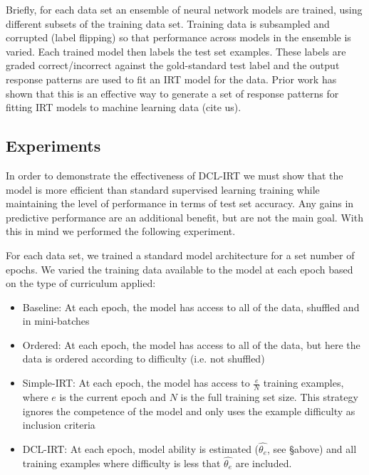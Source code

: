 \documentclass[letterpaper]{article} %
\begin{document}
Briefly, for each data set an ensemble of neural network models are trained, using different subsets of the training data set.
Training data is subsampled and corrupted (label flipping) so that performance across models in the ensemble is varied.
Each trained model then labels the test set examples.
These labels are graded correct/incorrect against the gold-standard test label and the output response patterns are used to fit an IRT model for the data.
Prior work has shown that this is an effective way to generate a set of response patterns for fitting IRT models to machine learning data (cite us).


\subsection{Experiments} 

In order to demonstrate the effectiveness of DCL-IRT we must show that the model is more efficient than standard supervised learning training while maintaining the level of performance in terms of test set accuracy. 
Any gains in predictive performance are an additional benefit, but are not the main goal.
With this in mind we performed the following experiment.

For each data set, we trained a standard model architecture for a set number of epochs. 
We varied the training data available to the model at each epoch based on the type of curriculum applied:

\begin{itemize}
	\item 
	Baseline: At each epoch, the model has access to all of the data, shuffled and in mini-batches
	\item 
	Ordered: At each epoch, the model has access to all of the data, but here the data is ordered according to difficulty (i.e. not shuffled) 
	\item 
	Simple-IRT: At each epoch, the model has access to $\frac{e}{N}$ training examples, where $e$ is the current epoch and $N$ is the full training set size. 
	This strategy ignores the competence of the model and only uses the example difficulty as inclusion criteria
	\item 
	DCL-IRT: At each epoch, model ability is estimated ($\hat{\theta_e}$, see \S above) and all training examples where difficulty is less that $\hat{\theta_e}$ are included.
\end{itemize}
\end{document}
